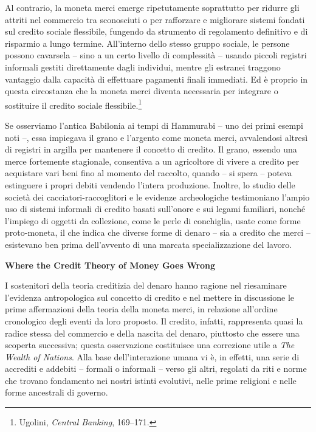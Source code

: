 \documentclass[
  a5paper,
  smalldemyvopaper,10pt,twoside,onecolumn,openright,extrafontsizes,hidelinks]{memoir}
\begin{document}
Al contrario, la moneta merci emerge ripetutamente soprattutto per
ridurre gli attriti nel commercio tra sconosciuti o per rafforzare e
migliorare sistemi fondati sul credito sociale flessibile, fungendo da
strumento di regolamento definitivo e di risparmio a lungo termine.
All'interno dello stesso gruppo sociale, le persone possono cavarsela --
sino a un certo livello di complessità -- usando piccoli registri
informali gestiti direttamente dagli individui, mentre gli estranei
traggono vantaggio dalla capacità di effettuare pagamenti finali
immediati. Ed è proprio in questa circostanza che la moneta merci
diventa necessaria per integrare o sostituire il credito sociale
flessibile.\footnote{Ugolini, \emph{Central Banking}, 169--171.}

Se osserviamo l'antica Babilonia ai tempi di Hammurabi -- uno dei primi
esempi noti --, essa impiegava il grano e l'argento come moneta merci,
avvalendosi altresì di registri in argilla per mantenere il concetto di
credito. Il grano, essendo una merce fortemente stagionale, consentiva a
un agricoltore di vivere a credito per acquistare vari beni fino al
momento del raccolto, quando -- si spera -- poteva estinguere i propri
debiti vendendo l'intera produzione. Inoltre, lo studio delle società
dei cacciatori-raccoglitori e le evidenze archeologiche testimoniano
l'ampio uso di sistemi informali di credito basati sull'onore e sui
legami familiari, nonché l'impiego di oggetti da collezione, come le
perle di conchiglia, usate come forme proto-moneta, il che indica che
diverse forme di denaro -- sia a credito che merci -- esistevano ben
prima dell'avvento di una marcata specializzazione del lavoro.

\textbf{Where the Credit Theory of Money Goes Wrong}

I sostenitori della teoria creditizia del denaro hanno ragione nel
riesaminare l'evidenza antropologica sul concetto di credito e nel
mettere in discussione le prime affermazioni della teoria della moneta
merci, in relazione all'ordine cronologico degli eventi da loro
proposto. Il credito, infatti, rappresenta quasi la radice stessa del
commercio e della nascita del denaro, piuttosto che essere una scoperta
successiva; questa osservazione costituisce una correzione utile a
\emph{The Wealth of Nations}. Alla base dell'interazione umana vi è, in
effetti, una serie di accrediti e addebiti -- formali o informali --
verso gli altri, regolati da riti e norme che trovano fondamento nei
nostri istinti evolutivi, nelle prime religioni e nelle forme ancestrali
di governo.
\end{document}
